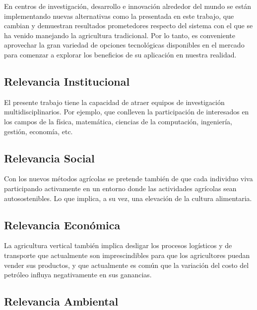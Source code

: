 \documentclass{report}
\begin{document}
  En centros de investigación, desarrollo e innovación alrededor del
  mundo se están implementando nuevas alternativas como la presentada en este
  trabajo, que cambian y demuestran resultados prometedores respecto del sistema
  con el que se ha venido manejando la agricultura tradicional. Por lo tanto, es
  conveniente aprovechar la gran variedad de opciones tecnológicas disponibles
  en el mercado para comenzar a explorar los beneficios de su aplicación en
  nuestra realidad.
  
\subsection{Relevancia Institucional}
  
  El presente trabajo tiene la capacidad de atraer equipos de investigación
  multidisciplinarios. Por ejemplo, que conlleven la participación de
  interesados en los campos de la física, matemática, ciencias de la
  computación, ingeniería, gestión, economía, etc.
  
  \subsection{Relevancia Social}
  
  Con los nuevos métodos agrícolas se pretende también de que cada individuo
  viva participando activamente en un entorno donde las actividades agrícolas
  sean autosostenibles. Lo que implica, a su vez, una elevación de la cultura
  alimentaria.
  
\subsection{Relevancia Económica}
  
  La agricultura vertical también implica desligar los procesos logísticos y de
  transporte que actualmente son imprescindibles para que los agricultores
  puedan vender sus productos, y que actualmente es común que la variación del
  costo del petróleo influya negativamente en sus ganancias.
  
\subsection{Relevancia Ambiental}
  
\end{document}
